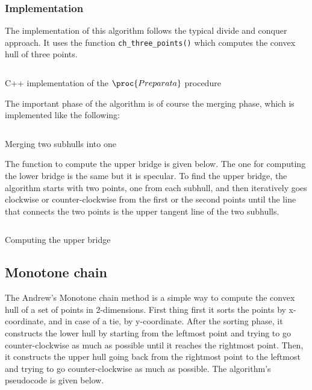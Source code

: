 \documentclass{article}
\begin{document}
\subsubsection*{Implementation}
The implementation of this algorithm follows the typical divide and conquer approach. It uses the function \texttt{ch_three_points()} which computes the convex hull of three points.
\begin{listing}[H]
    \inputminted[linenos]{cpp}{code/preparata.cpp}
    \caption{C++ implementation of the $\proc{Preparata}$ procedure}
\end{listing}

The important phase of the algorithm is of course the merging phase, which is implemented like the following:
\begin{listing}[H]
    \inputminted[linenos]{cpp}{code/preparata_merge.cpp}
    \caption{Merging two subhulls into one}
\end{listing}

The function to compute the upper bridge is given below. The one for computing the lower bridge is the same but it is specular. To find the upper bridge, the algorithm starts with two points, one from each subhull, and then iteratively goes clockwise or counter-clockwise from the first or the second points until the line that connects the two points is the upper tangent line of the two subhulls. 
\begin{listing}[H]
    \inputminted[linenos]{cpp}{code/preparata_upper_bridge.cpp}
    \caption{Computing the upper bridge}
\end{listing}

\newpage
\subsection{Monotone chain}

The Andrew's Monotone chain method is a simple way to compute the convex hull of a set of points in 2-dimensions. First thing first it sorts the points by x-coordinate, and in case of a tie, by y-coordinate. After the sorting phase, it constructs the lower hull by starting from the leftmost point and trying to go counter-clockwise as much as possible until it reaches the rightmost point. Then, it constructs the upper hull going back from the rightmost point to the leftmost and trying to go counter-clockwise as much as possible. The algorithm's pseudocode is given below.
\end{document}
